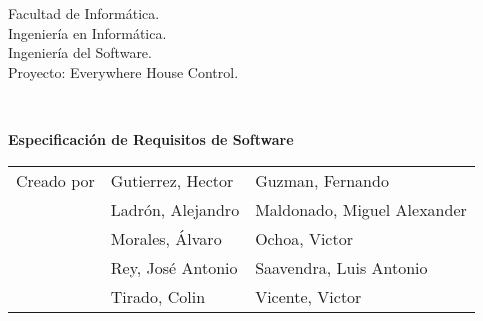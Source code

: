 \begin{titlepage}
    \begin{scriptsize}\noindent Facultad de Informática.\\
        Ingeniería en Informática.\\
        Ingeniería del Software.\\
        Proyecto: Everywhere House Control.
    \end{scriptsize}\\
    \vfill
    \begin{center}
        \begin{Large}
            \textbf{Especificación de Requisitos de Software}
        \end{Large}
    \end{center}
    \vfill
    \begin{flushright}
        \begin{scriptsize}
            \begin{tabular}{lll}
            Creado por & Gutierrez, Hector & Guzman, Fernando  \\
                 & Ladrón, Alejandro & Maldonado, Miguel Alexander \\
                 & Morales, Álvaro & Ochoa, Victor \\
                 & Rey, José Antonio & Saavendra, Luis Antonio  \\
                 & Tirado, Colin & Vicente, Victor \\
            \end{tabular}
        \end{scriptsize}
    \end{flushright}
\end{titlepage}
\thispagestyle{empty}
\cleardoublepage
\newpage

\tableofcontents
\newpage
\thispagestyle{empty}
\cleardoublepage
\newpage
{}
\raggedbottom
{}






